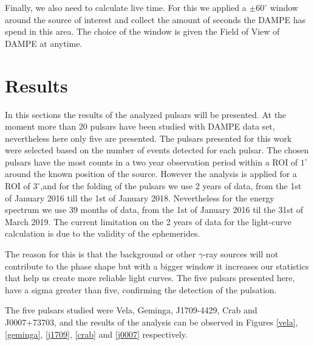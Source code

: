 \documentclass{PoS}
\begin{document}
Finally, we also need to calculate live time. For this we applied a $ \pm 60^{\circ}$ window around the source of interest and collect the amount of seconds the DAMPE has spend in this area. The choice of the window is given the Field of View of DAMPE at anytime.  


\section{Results}
In this  sections  the  results of the analyzed pulsars will be presented. At the moment more than 20 pulsars have been  studied with DAMPE data set, nevertheless here only five are presented. The pulsars presented for this work were selected based on the number of events detected for each pulsar. The chosen pulsars have the most counts  in a  two year observation period within a ROI of $1^\circ$ around the known position of the source. However the analysis is applied  for a ROI of $3^\circ$,and for the folding of the pulsars we use 2 years of data, from the 1st of January 2016 till the 1st of January 2018.  Nevertheless for the  energy spectrum we use 39 months of data, from the 1st of January 2016 til the  31st of March 2019. The current limitation on the 2 years of data for the  light-curve calculation is due to the validity of the ephemerides. 

 The reason for this is that  the background or other $\gamma$-ray sources will not contribute  to the phase shape but with a bigger window it increases our statistics that help us create more reliable  light curves. The five pulsars presented here, have a sigma greater than five, confirming the detection of the pulsation.
 
The five pulsars studied were Vela, Geminga, J1709-4429, Crab and J0007+73703, and the results of the analysis can be observed in Figures \ref{vela}, \ref{geminga}, \ref{j1709}, \ref{crab} and \ref{j0007} respectively. 
\end{document}
